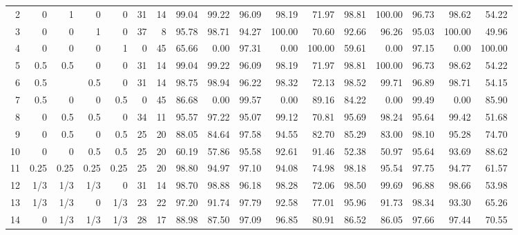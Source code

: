 \begin{landscape}
\begin{table}[p]
{\begin{tabular}{rrrrrrrrrrrrrrrrr}
2 & 0 & 1 & 0 & 0 & \multicolumn{1}{|r}{31} & 14 & \multicolumn{1}{|r}{99.04} & 99.22 & 96.09 & 98.19 & 71.97 & \multicolumn{1}{|r}{98.81} & 100.00 & 96.73 & 98.62 & 54.22 \\
3 & 0 & 0 & 1 & 0 & \multicolumn{1}{|r}{37} & 8 & \multicolumn{1}{|r}{95.78} & 98.71 & 94.27 & 100.00 & 70.60 & \multicolumn{1}{|r}{92.66} & 96.26 & 95.03 & 100.00 & 49.96 \\
4 & 0 & 0 & 0 & 1 & \multicolumn{1}{|r}{0} & 45 & \multicolumn{1}{|r}{65.66} & 0.00 & 97.31 & 0.00 & 100.00 & \multicolumn{1}{|r}{59.61} & 0.00 & 97.15 & 0.00 & 100.00 \\
5 & 0.5 & 0.5 & 0 & 0 & \multicolumn{1}{|r}{31} & 14 & \multicolumn{1}{|r}{99.04} & 99.22 & 96.09 & 98.19 & 71.97 & \multicolumn{1}{|r}{98.81} & 100.00 & 96.73 & 98.62 & 54.22 \\
6 & 0.5 &  & 0.5 & 0 & \multicolumn{1}{|r}{31} & 14 & \multicolumn{1}{|r}{98.75} & 98.94 & 96.22 & 98.32 & 72.13 & \multicolumn{1}{|r}{98.52} & 99.71 & 96.89 & 98.71 & 54.15 \\
7 & 0.5 & 0 & 0 & 0.5 & \multicolumn{1}{|r}{0} & 45 & \multicolumn{1}{|r}{86.68} & 0.00 & 99.57 & 0.00 & 89.16 & \multicolumn{1}{|r}{84.22} & 0.00 & 99.49 & 0.00 & 85.90 \\
8 & 0 & 0.5 & 0.5 & 0 & \multicolumn{1}{|r}{34} & 11 & \multicolumn{1}{|r}{95.57} & 97.22 & 95.07 & 99.12 & 70.81 & \multicolumn{1}{|r}{95.69} & 98.24 & 95.64 & 99.42 & 51.68 \\
9 & 0 & 0.5 & 0 & 0.5 & \multicolumn{1}{|r}{25} & 20 & \multicolumn{1}{|r}{88.05} & 84.64 & 97.58 & 94.55 & 82.70 & \multicolumn{1}{|r}{85.29} & 83.00 & 98.10 & 95.28 & 74.70 \\
10 & 0 & 0 & 0.5 & 0.5 & \multicolumn{1}{|r}{25} & 20 & \multicolumn{1}{|r}{60.19} & 57.86 & 95.58 & 92.61 & 91.46 & \multicolumn{1}{|r}{52.38} & 50.97 & 95.64 & 93.69 & 88.62 \\
11 & 0.25 & 0.25 & 0.25 & 0.25 & \multicolumn{1}{|r}{25} & 20 & \multicolumn{1}{|r}{98.80} & 94.97 & 97.10 & 94.08 & 74.98 & \multicolumn{1}{|r}{98.18} & 95.54 & 97.75 & 94.77 & 61.57 \\
12 & 1/3 & 1/3 & 1/3 & 0 & \multicolumn{1}{|r}{31} & 14 & \multicolumn{1}{|r}{98.70} & 98.88 & 96.18 & 98.28 & 72.06 & \multicolumn{1}{|r}{98.50} & 99.69 & 96.88 & 98.66 & 53.98 \\
13 & 1/3 & 1/3 & 0 & 1/3 & \multicolumn{1}{|r}{23} & 22 & \multicolumn{1}{|r}{97.20} & 91.74 & 97.79 & 92.58 & 77.01 & \multicolumn{1}{|r}{95.96} & 91.73 & 98.34 & 93.30 & 65.26 \\
14 & 0 & 1/3 & 1/3 & 1/3 & \multicolumn{1}{|r}{28} & 17 & \multicolumn{1}{|r}{88.98} & 87.50 & 97.09 & 96.85 & 80.91 & \multicolumn{1}{|r}{86.52} & 86.05 & 97.66 & 97.44 & 70.55
\end{tabular}
}
\end{table}
\end{landscape}



